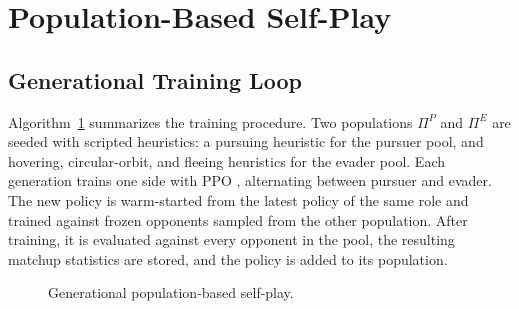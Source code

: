 \section{Population-Based Self-Play}
\label{sec:selfplay}

\subsection{Generational Training Loop}
\noindent
Algorithm~\ref{alg:selfplay} summarizes the training procedure. Two populations $\Pi^P$ and $\Pi^E$ are seeded with scripted heuristics: a pursuing heuristic for the pursuer pool, and hovering, circular-orbit, and fleeing heuristics for the evader pool. Each generation trains one side with PPO \cite{yuSurprisingEffectivenessPPO}, alternating between pursuer and evader. The new policy is warm-started from the latest policy of the same role and trained against frozen opponents sampled from the other population. After training, it is evaluated against every opponent in the pool, the resulting matchup statistics are stored, and the policy is added to its population.

\begin{figure}[t]
    \begin{center}
    \end{center}
    \caption[Generational self-play algorithm]{Generational population-based self-play.}
    \label{alg:selfplay}
\end{figure}

